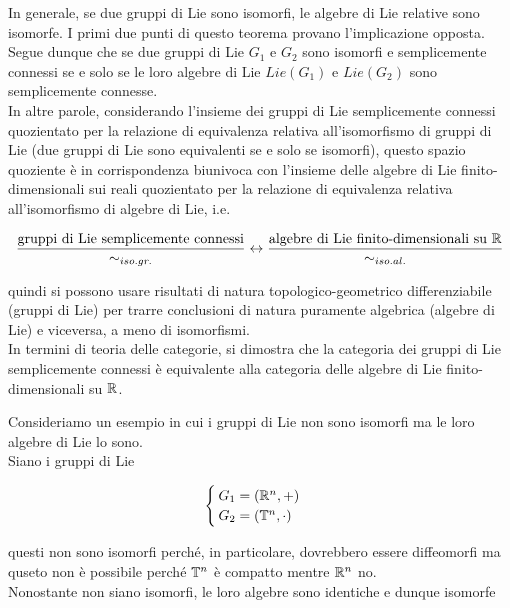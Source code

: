 \begin{remark}
	In generale, se due gruppi di Lie sono isomorfi, le algebre di Lie relative sono isomorfe. I primi due punti di questo teorema provano l'implicazione opposta.\\
	Segue dunque che se due gruppi di Lie $ G_{1} $ e $ G_{2} $ sono isomorfi e semplicemente connessi se e solo se le loro algebre di Lie $ Lie(G_{1}) $ e $ Lie(G_{2}) $ sono semplicemente connesse.\\
	In altre parole, considerando l'insieme dei gruppi di Lie semplicemente connessi quozientato per la relazione di equivalenza relativa all'isomorfismo di gruppi di Lie (due gruppi di Lie sono equivalenti se e solo se isomorfi), questo spazio quoziente è in corrispondenza biunivoca con l'insieme delle algebre di Lie finito-dimensionali sui reali quozientato per la relazione di equivalenza relativa all'isomorfismo di algebre di Lie, i.e.
	
	\begin{equation}
		\dfrac{\text{gruppi di Lie semplicemente connessi}}{\sim_{iso.gr.}} \leftrightarrow \dfrac{\text{algebre di Lie finito-dimensionali su } \mathbb{R}}{\sim_{iso.al.}}
	\end{equation}
	
	quindi si possono usare risultati di natura topologico-geometrico differenziabile (gruppi di Lie) per trarre conclusioni di natura puramente algebrica (algebre di Lie) e viceversa, a meno di isomorfismi.\\
	In termini di teoria delle categorie, si dimostra che la categoria dei gruppi di Lie semplicemente connessi è equivalente alla categoria delle algebre di Lie finito-dimensionali su $ \mathbb{R} $.
\end{remark}

Consideriamo un esempio in cui i gruppi di Lie non sono isomorfi ma le loro algebre di Lie lo sono.\\
Siano i gruppi di Lie

\begin{equation}
	\begin{cases}
		G_{1} = (\mathbb{R}^{n},+)\\
		G_{2} = (\mathbb{T}^{n},\cdot)
	\end{cases}
\end{equation}

questi non sono isomorfi perché, in particolare, dovrebbero essere diffeomorfi ma quseto non è possibile perché $ \mathbb{T}^{n} $ è compatto mentre $ \mathbb{R}^{n} $ no.\\
Nonostante non siano isomorfi, le loro algebre sono identiche e dunque isomorfe


